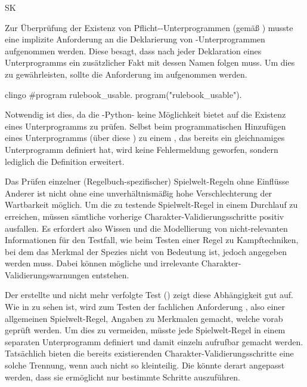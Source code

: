 \begin{enumerateWithCode}{SK}
    \item Zur Überprüfung der Existenz von Pflicht--Unterprogrammen (gemäß ) musste eine implizite Anforderung an die Deklarierung von -Unterprogrammen aufgenommen werden.
    Diese besagt, dass nach jeder Deklaration eines Unterprogramms ein zusätzlicher Fakt mit dessen Namen folgen muss.
    Um dies zu gewährleisten, sollte die Anforderung im  aufgenommen werden.
    \begin{mintedNameless}{clingo}
#program rulebook_usable.
program("rulebook_usable").
    \end{mintedNameless}
    Notwendig ist dies, da die -Python- keine Möglichkeit bietet auf die Existenz eines Unterprogramms zu prüfen.
    Selbst beim programmatischen Hinzufügen eines Unterprogramms (über diese ) zu einem , das bereits ein gleichnamiges Unterprogramm definiert hat, wird keine Fehlermeldung geworfen, sondern lediglich die Definition erweitert.

    \item Das Prüfen einzelner (Regelbuch-spezifischer) Spielwelt-Regeln ohne Einflüsse Anderer ist nicht ohne eine unverhältnismäßig hohe Verschlechterung der Wartbarkeit möglich.
    Um die zu testende Spielwelt-Regel in einem Durchlauf zu erreichen, müssen sämtliche vorherige Charakter-Validierungsschritte positiv ausfallen.
    Es erfordert also Wissen und die Modellierung von nicht-relevanten Informationen für den Testfall, wie \zB beim Testen einer Regel zu Kampftechniken, bei dem das Merkmal der Spezies nicht von Bedeutung ist, jedoch angegeben werden muss.
    Dabei können mögliche und irrelevante Charakter-Validierungswarnungen entstehen.

    Der erstellte und nicht mehr verfolgte Test  () zeigt diese Abhängigkeit gut auf.
    Wie in  zu sehen ist, wird zum Testen der fachlichen Anforderung , also einer allgemeinen Spielwelt-Regel, Angaben zu Merkmalen gemacht, welche vorab geprüft werden.
    Um dies zu vermeiden, müsste jede Spielwelt-Regel in einem separaten Unterprogramm definiert und damit einzeln aufrufbar gemacht werden.
    Tatsächlich bieten die bereits existierenden Charakter-Validierungsschritte eine solche Trennung, wenn auch nicht so kleinteilig.
    Die  könnte derart angepasst werden, dass sie ermöglicht nur bestimmte Schritte auszuführen.
    \begin{listing}[htbp]
        \caption{Auszug von \protect{}}\label{lst:auszug-test-hero-validation}
        \inputminted[firstline=40,lastline=46]{python}{appendix/test_hero_validation.py}
    \end{listing}


\end{enumerateWithCode}
